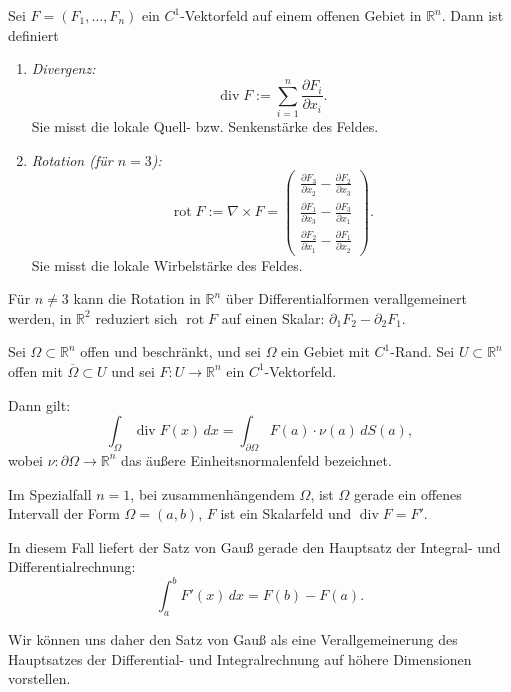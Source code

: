 \documentclass[11pt, a4paper]{article}
\begin{document}
\begin{note}

Sei $F = (F_1, \dots, F_n)$ ein $C^1$-Vektorfeld auf einem offenen Gebiet in $\mathbb{R}^n$. Dann ist definiert

\begin{enumerate}[label = $-$]
    \item \emph{Divergenz:} 
    \[
    \operatorname{div} F := \sum_{i=1}^n \frac{\partial F_i}{\partial x_i}.
    \]
    Sie misst die lokale Quell- bzw. Senkenstärke des Feldes.

    \item \emph{Rotation (für $n=3$):} 
    \[
    \operatorname{rot} F := 
    \nabla \times F 
    =
    \begin{pmatrix}
    \frac{\partial F_3}{\partial x_2} - \frac{\partial F_2}{\partial x_3} \\
    \frac{\partial F_1}{\partial x_3} - \frac{\partial F_3}{\partial x_1} \\
    \frac{\partial F_2}{\partial x_1} - \frac{\partial F_1}{\partial x_2}
    \end{pmatrix}.
    \]
    Sie misst die lokale Wirbelstärke des Feldes.
\end{enumerate}

Für $n \neq 3$ kann die Rotation in \(\mathbb{R}^n\) über Differentialformen verallgemeinert werden,  
in \(\mathbb{R}^2\) reduziert sich \(\operatorname{rot} F\) auf einen Skalar: 
\(\partial_1 F_2 - \partial_2 F_1\).
\end{note}


\begin{theorem}

Sei $\Omega \subset \mathbb{R}^n$ offen und beschränkt, und sei $\Omega$ ein Gebiet mit $C^1$-Rand.  
Sei $U \subset \mathbb{R}^n$ offen mit $\overline{\Omega} \subset U$ und sei 
$F : U \to \mathbb{R}^n$ ein $C^1$-Vektorfeld.  

Dann gilt:
\[
\int_{\Omega} \operatorname{div} F(x) \, dx
=
\int_{\partial \Omega} F(a) \cdot \nu(a) \, dS(a),
\]
wobei $\nu : \partial \Omega \to \mathbb{R}^n$ das äußere Einheitsnormalenfeld bezeichnet.
\end{theorem}

\begin{note}

Im Spezialfall $n=1$, bei zusammenhängendem $\Omega$, ist $\Omega$ gerade ein offenes Intervall 
der Form $\Omega = (a,b)$, $F$ ist ein Skalarfeld und $\operatorname{div} F = F'$.  

In diesem Fall liefert der Satz von Gauß gerade den Hauptsatz der Integral- und Differentialrechnung:
\[
\int_a^b F'(x) \, dx = F(b) - F(a).
\]

Wir können uns daher den Satz von Gauß als eine Verallgemeinerung 
des Hauptsatzes der Differential- und Integralrechnung auf höhere Dimensionen vorstellen.
\end{note}
\end{document}

